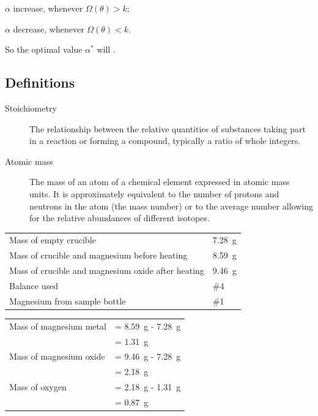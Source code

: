 \documentclass{article}
\begin{document}
$\alpha$ increase, whenever $\Omega(\theta) > k$;

$\alpha$ decrease, whenever $\Omega(\theta) < k$.

So the optimal value $\alpha^* $ will {\color{red}{encourage $\Omega(\theta)$ to shrink, but not so strongly to make $\Omega(\theta)$ less than k}}.



\subsection{Definitions}
\label{definitions}
\begin{description}
\item[Stoichiometry]
The relationship between the relative quantities of substances taking part in a reaction or forming a compound, typically a ratio of whole integers.
\item[Atomic mass]
The mass of an atom of a chemical element expressed in atomic mass units. It is approximately equivalent to the number of protons and neutrons in the atom (the mass number) or to the average number allowing for the relative abundances of different isotopes. 
\end{description} 

\begin{tabular}{ll}
Mass of empty crucible & \SI{7.28}{\gram}\\
Mass of crucible and magnesium before heating & \SI{8.59}{\gram}\\
Mass of crucible and magnesium oxide after heating & \SI{9.46}{\gram}\\
Balance used & \#4\\
Magnesium from sample bottle & \#1
\end{tabular}


\begin{tabular}{ll}
Mass of magnesium metal & = \SI{8.59}{\gram} - \SI{7.28}{\gram}\\
& = \SI{1.31}{\gram}\\
Mass of magnesium oxide & = \SI{9.46}{\gram} - \SI{7.28}{\gram}\\
& = \SI{2.18}{\gram}\\
Mass of oxygen & = \SI{2.18}{\gram} - \SI{1.31}{\gram}\\
& = \SI{0.87}{\gram}
\end{tabular}
\end{document}
